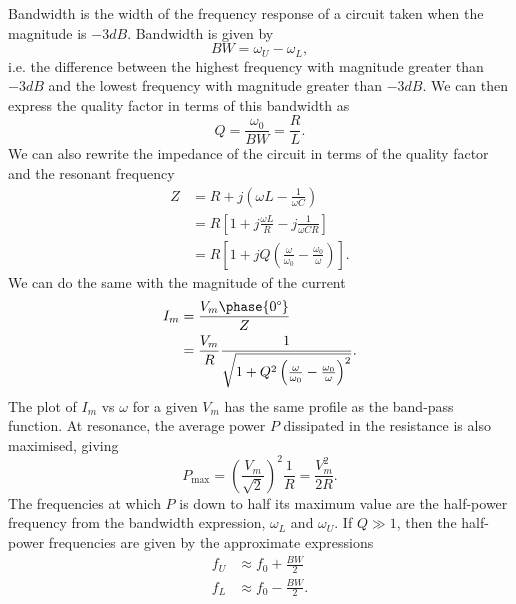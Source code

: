 \documentclass{article}
\begin{document}
Bandwidth is the width of the frequency response of a circuit taken when the magnitude is $-3dB$. Bandwidth is given by 
\[
    BW=\omega _U-\omega _L,
\]
i.e. the difference between the highest frequency with magnitude greater than $-3dB$ and the lowest frequency with magnitude greater than $-3dB$. We can then express the quality factor in terms of this bandwidth as 
\[
    Q=\frac{\omega _0}{BW}=\frac{R}{L}.
\]
We can also rewrite the impedance of the circuit in terms of the quality factor and the resonant frequency
\begin{align*}
    Z &= R+j \left( \omega L -\frac{1}{\omega C}\right) \\
      &=R \left[ 1+j \frac{\omega L}{R}-j \frac{1}{\omega CR}\right] \\
      &=R \left[ 1+jQ \left( \frac{\omega }{\omega _0}-\frac{\omega _0}{\omega } \right) \right].
\end{align*}
We can do the same with the magnitude of the current
\begin{align*}
    I_m &= \frac{V_m\phase{0\degree}}{Z}\\
        &=\frac{V_m}{R}\frac{1}{\sqrt{1+Q^2 \left( \frac{\omega }{\omega _0}-\frac{\omega _0}{\omega } \right)^2}}.
\end{align*}
The plot of $I_m$ vs $\omega $ for a given $V_m$ has the same profile as the band-pass function. At resonance, the average power $P$ dissipated in the resistance is also maximised, giving 
\[
    P_{\text{max}}=\left( \frac{V_m}{\sqrt{2}} \right)^2 \frac{1}{R}=\frac{V_m^2}{2R}.
\]
The frequencies at which $P$ is down to half its maximum value are the half-power frequency from the bandwidth expression, $\omega _L$ and $\omega _U$. If $Q \gg 1$, then the half-power frequencies are given by the approximate expressions
\begin{align*}
    f_U &\approx f_0+\frac{BW}{2}\\
    f_L&\approx f_0-\frac{BW}{2}.
\end{align*}
\end{document}
